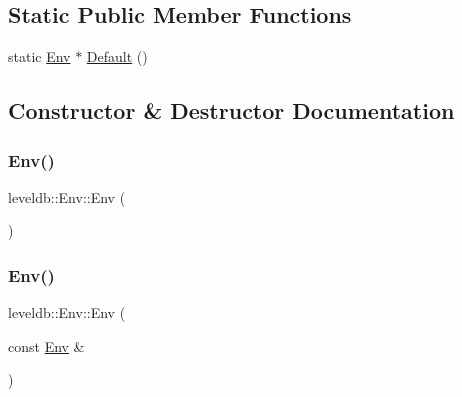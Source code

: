 \subsection*{Static Public Member Functions}
\begin{DoxyCompactItemize}
\item 
static \mbox{\hyperlink{classleveldb_1_1_env}{Env}} $\ast$ \mbox{\hyperlink{classleveldb_1_1_env_ab25f3129d5bc63cf3418d362e0e35912}{Default}} ()
\end{DoxyCompactItemize}


\subsection{Constructor \& Destructor Documentation}
\mbox{\label{classleveldb_1_1_env_a35c9ebc8e8105588d95343c69834827e}} 
\subsubsection{\texorpdfstring{Env()}{Env()}\hspace{0.1cm}{\footnotesize\ttfamily [1/2]}}
{\footnotesize\ttfamily leveldb\+::\+Env\+::\+Env (\begin{DoxyParamCaption}{ }\end{DoxyParamCaption})\hspace{0.3cm}{\ttfamily [default]}}

\mbox{\label{classleveldb_1_1_env_a44fbfd1f9fc297611ede34c4c9e035e7}} 
\subsubsection{\texorpdfstring{Env()}{Env()}\hspace{0.1cm}{\footnotesize\ttfamily [2/2]}}
{\footnotesize\ttfamily leveldb\+::\+Env\+::\+Env (\begin{DoxyParamCaption}\item[{const \mbox{\hyperlink{classleveldb_1_1_env}{Env}} \&}]{ }\end{DoxyParamCaption})\hspace{0.3cm}{\ttfamily [delete]}}

\mbox{\label{classleveldb_1_1_env_aeab8b8a19cd38effb685323d1ae7d4d5}} 
